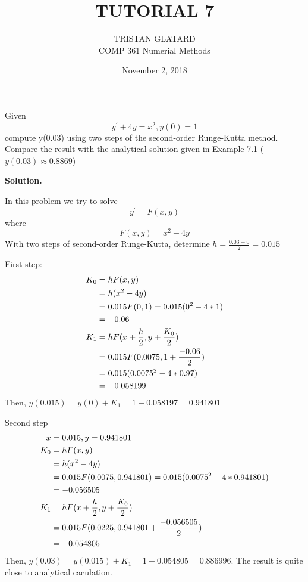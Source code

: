  

 

\title{TUTORIAL 7}%
\author{TRISTAN GLATARD\\ %
COMP 361 Numerial Methods} %
\date{November 2, 2018} 
\maketitle

\begin{exercise}{1} %
Given $$y^\prime + 4y = x^2, y(0) = 1$$ compute y(0.03) using two steps of the second-order Runge-Kutta method. Compare the result with the analytical solution given in Example 7.1 (\textbf{$y(0.03)\approx 0.8869$})

\textbf{Solution.} 

In this problem we try to solve $$y^\prime=F(x,y)$$ where 
\[F(x,y)=x^2-4y\]With two steps of second-order Runge-Kutta, determine $h=\frac{0.03-0}{2}=0.015$


First step:
\begin{align}
K_0&=hF(x,y) \notag \\
&=h(x^2-4y) \notag \\
&=0.015F(0,1) =0.015(0^2-4*1) \notag \\
&=-0.06 \notag \\
K_1&=hF(x+\frac{h}{2},y+\frac{K_0}{2}) \notag \\
&=0.015F(0.0075,1+\frac{-0.06}{2}) \notag \\
&=0.015(0.0075^2-4*0.97) \notag \\
&=-0.058199 \notag
\end{align}
Then, $y(0.015) = y(0) + K_1 = 1 -0.058197 = 0.941801$

Second step
\begin{align}
x&=0.015, y = 0.941801 \notag \\
K_0&=hF(x,y) \notag \\
&=h(x^2-4y) \notag \\
&=0.015F(0.0075,0.941801) =0.015(0.0075^2-4*0.941801) \notag \\
&=-0.056505 \notag \\
K_1&=hF(x+\frac{h}{2},y+\frac{K_0}{2}) \notag \\
&=0.015F(0.0225,0.941801+\frac{-0.056505}{2}) \notag \\
&=-0.054805 \notag
\end{align}
Then, $y(0.03) = y(0.015) + K_1 = 1 -0.054805 = 0.886996$.
The result is quite close to analytical caculation. 

\end{exercise}



